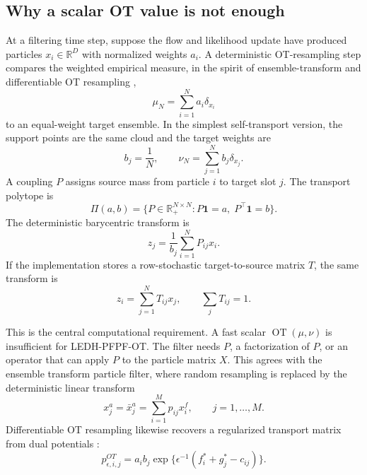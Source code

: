 \documentclass[11pt]{article}
\newcommand{\R}{\mathbb{R}}
\newcommand{\ones}{\mathbf{1}}
\newcommand{\OT}{\operatorname{OT}}
\begin{document}
\subsection{Why a scalar OT value is not enough}

At a filtering time step, suppose the flow and likelihood update have produced
particles $x_i\in\R^D$ with normalized weights $a_i$.  A deterministic
OT-resampling step compares the weighted empirical measure, in the spirit of
ensemble-transform and differentiable OT resampling
\citep{reich2013nonparametric,corenflos2021differentiable},
\begin{equation}
\mu_N = \sum_{i=1}^N a_i \delta_{x_i}
\label{eq:source-empirical}
\end{equation}
to an equal-weight target ensemble.  In the simplest self-transport version,
the support points are the same cloud and the target weights are
\begin{equation}
b_j = \frac{1}{N},
\qquad
\nu_N = \sum_{j=1}^N b_j \delta_{x_j}.
\label{eq:target-empirical}
\end{equation}
A coupling $P$ assigns source mass from particle $i$ to target slot $j$.  The
transport polytope is
\begin{equation}
\Pi(a,b)
=
\{P\in\R_+^{N\times N}: P\ones=a,\;P^\top\ones=b\}.
\label{eq:transport-polytope}
\end{equation}
The deterministic barycentric transform is
\begin{equation}
z_j
=
\frac{1}{b_j}\sum_{i=1}^N P_{ij}x_i.
\label{eq:barycentric-column}
\end{equation}
If the implementation stores a row-stochastic target-to-source matrix $T$, the
same transform is
\begin{equation}
z_i = \sum_{j=1}^N T_{ij}x_j,
\qquad
\sum_j T_{ij}=1.
\label{eq:barycentric-row}
\end{equation}

This is the central computational requirement.  A fast scalar
$\OT(\mu,\nu)$ is insufficient for LEDH-PFPF-OT.  The filter needs $P$, a
factorization of $P$, or an operator that can apply $P$ to the particle matrix
$X$.  This agrees with the ensemble transform particle filter, where random
resampling is replaced by the deterministic linear transform
\citep{reich2013nonparametric}
\begin{equation}
x_j^a = \bar x_j^a = \sum_{i=1}^M p_{ij} x_i^f,
\qquad j=1,\ldots,M.
\label{eq:reich-transform}
\end{equation}
Differentiable OT resampling likewise recovers a regularized transport matrix
from dual potentials \citep{corenflos2021differentiable}:
\begin{equation}
p^{OT}_{\epsilon,i,j}
=
a_i b_j
\exp\{\epsilon^{-1}(f_i^\ast+g_j^\ast-c_{ij})\}.
\label{eq:corenflos-plan}
\end{equation}
\end{document}
